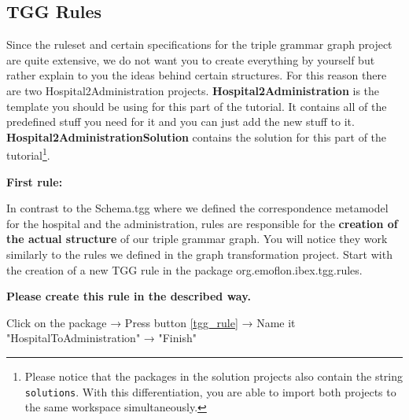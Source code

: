 \clearpage

\subsection{TGG Rules}

Since the ruleset and certain specifications for the triple grammar graph project are quite extensive, we do not want you to create everything by yourself but rather explain to you the ideas behind certain structures. For this reason there are two Hospital2Administration projects. \textbf{Hospital2Administration} is the template you should be using for this part of the tutorial. It contains all of the predefined stuff you need for it and you can just add the new stuff to it. \textbf{Hospital2AdministrationSolution} contains the solution for this part of the tutorial\footnote{Please notice that the packages in the solution projects also contain the string \texttt{solutions}. With this differentiation, you are able to import both projects to the same workspace simultaneously.}.\newline

\textbf{First rule:}

In contrast to the Schema.tgg where we defined the correspondence metamodel for the hospital and the administration, rules are responsible for the \textbf{creation of the actual structure} of our triple grammar graph. You will notice they work similarly to the rules we defined in the graph transformation project. Start with the creation of a new TGG rule in the package \textsf{org.emoflon.ibex.tgg.rules}.\newline

\textbf{Please create this rule in the described way.}\newline

\centering

Click on the package →  Press button \ref{tgg_rule} → Name it \textsf{"HospitalToAdministration"} → \textsf{"Finish"}\newline

\raggedright

